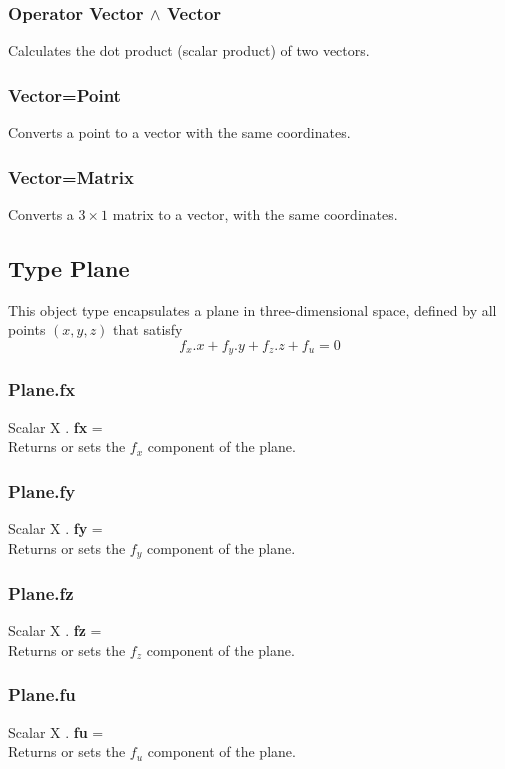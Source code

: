 \subsubsection{Operator Vector $\wedge$ Vector \label{O:Vector^Vector}}
Calculates the dot product (scalar product) of two vectors.

\subsubsection{Vector=Point \label{C:Vector=Point}}
Converts a point to a vector with the same coordinates.

\subsubsection{Vector=Matrix \label{C:Vector=Matrix}}
Converts a $3 \times 1$ matrix  to a vector, with the same coordinates.

\subsection{Type Plane \label{T:Plane}}
This object type encapsulates a plane in three-dimensional space, defined by all points $(x,y,z)$ that satisfy
\begin{equation}
f_x . x + f_y . y + f_z . z + f_u = 0
\end{equation}

\subsubsection{Plane.fx \label{F:Plane:fx}}
Scalar X . \textbf{fx} = \\
Returns or sets the $f_x$ component of the plane.

\subsubsection{Plane.fy \label{F:Plane:fy}}
Scalar X . \textbf{fy} = \\
Returns or sets the $f_y$ component of the plane.

\subsubsection{Plane.fz \label{F:Plane:fz}}
Scalar X . \textbf{fz} = \\
Returns or sets the $f_z$ component of the plane.

\subsubsection{Plane.fu \label{F:Plane:fu}}
Scalar X . \textbf{fu} = \\
Returns or sets the $f_u$ component of the plane.

